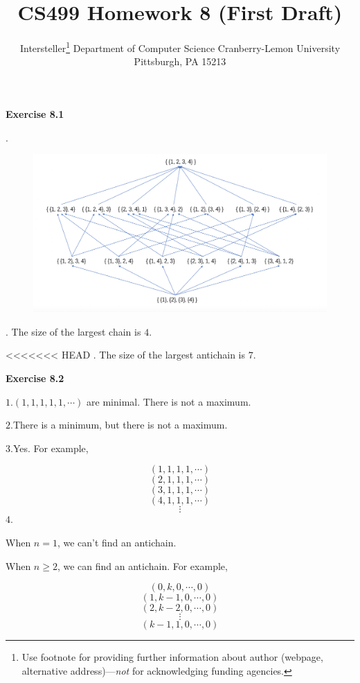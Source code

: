 \documentclass{article} %
\title{CS499 Homework 8 (First Draft)}
\author{
	Intersteller\thanks{ Use footnote for providing further information
		about author (webpage, alternative address)---\emph{not} for acknowledging
		funding agencies.}
	Department of Computer Science
	Cranberry-Lemon University
	Pittsburgh, PA 15213
}
\begin{document}
	\maketitle
	\textbf{Exercise 8.1}\par
	.\par
  	\begin{figure}[H]
  	\centering
  	\includegraphics[scale=0.5]{8_1.png}
  	\caption{}
  	\label{}
  	\end{figure}
	. The size of the largest chain is $4$.\par
<<<<<<< HEAD
	 . The size of the largest antichain is $7$.\par

\textbf{Exercise 8.2}\par
    $1.(1,1,1,1,1,\cdots)$ are minimal. There is not a maximum.\par
    $2.$There is a minimum, but there is not a maximum.\par
    $3.$Yes. For example,\par
    $$(1,1,1,1,\cdots)$$
    $$(2,1,1,1,\cdots)$$
    $$(3,1,1,1,\cdots)$$
    $$(4,1,1,1,\cdots)$$
    $$\vdots$$
    $4.$\par
    When $n=1$, we can't find an antichain.\par
    When $n\ge 2$, we can find an antichain. For example,\par
    $$(0,k,0,\cdots,0)$$
    $$(1,k-1,0,\cdots,0)$$
    $$(2,k-2,0,\cdots,0)$$
    $$\vdots$$
    $$(k-1,1,0,\cdots,0)$$
    
\end{document}
